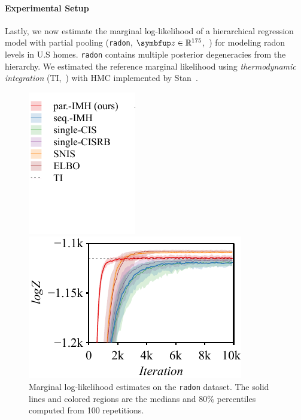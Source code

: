 \paragraph{Experimental Setup}
Lastly, we now estimate the marginal log-likelihood of a hierarchical regression model with partial pooling (\texttt{radon}, \(\vz \in \mathbb{R}^{175}\),~\citealt{gelman_data_2007}) for modeling radon levels in U.S homes.
\texttt{radon} contains multiple posterior degeneracies from the hierarchy.
We estimated the reference marginal likelihood using \textit{thermodynamic integration} (TI,~\citealt{gelman_simulating_1998, neal_annealed_2001, lartillot_computing_2006}) with HMC implemented by Stan~\citep{carpenter_stan_2017, betancourt_conceptual_2017}.
%
\begin{figure}[H]
  \vspace{-0.15in}
  \centering
  \begin{minipage}[b]{0.3\linewidth}
    \centering
    \includegraphics[scale=0.8]{figures/radon_03.pdf}
  \end{minipage}
  \begin{minipage}[b]{0.6\linewidth}
    \centering
    \includegraphics[scale=0.8]{figures/radon_02.pdf}
  \end{minipage}
    \vspace{-0.1in}
  \caption{Marginal log-likelihood estimates on the \texttt{radon} dataset.
    The solid lines and colored regions are the medians and 80\% percentiles computed from 100 repetitions.
  }\label{fig:marginal_likelihood}
  \vspace{-0.1in}
\end{figure}
%
  \vspace{-0.2in}
